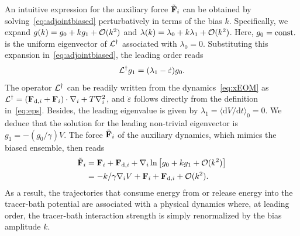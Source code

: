 \documentclass[pre, superscriptaddress, twocolumn,pre]{revtex4-1}
\newcommand{\dd}{\text{d}}
\begin{document}
An intuitive expression for the auxiliary force $\tilde{\bf F}_i$ can be obtained by solving~\eqref{eq:adjointbiased} perturbatively in terms of the bias $k$. Specifically, we expand $g(k)=g_0 + k g_1 + {\cal O}(k^2)$ and $\lambda(k)= \lambda_0 + k \lambda_1 + {\cal O}(k^2)$. Here, $g_0 = {\rm const.}$ is the uniform eigenvector of ${\cal L}^\dagger$ associated with $\lambda_0=0$. Substituting this expansion in~\eqref{eq:adjointbiased}, the leading order reads
\begin{equation}
		{\cal L}^\dagger g_1 = (\lambda_1 - \dot\varepsilon) g_0 .
\end{equation}
The operator ${\cal L}^\dagger$ can be readily written from the dynamics~\eqref{eq:xEOM} as ${\cal L}^\dagger = ({\bf F}_{{\rm d},i}+{\bf F}_i) \cdot \nabla_i + T \nabla^2_i$, and $\dot\varepsilon$ follows directly from the definition in~\eqref{eq:eps}. Besides, the leading eigenvalue is given by $\lambda_1 = \langle\dd V/\dd t\rangle_0 = 0$. We deduce that the solution for the leading non-trivial eigenvector is $g_1 = -(g_0/\gamma) V$. The force $\tilde{\bf F}_i$ of the auxiliary dynamics, which mimics the biased ensemble, then reads
\begin{equation}\label{eq:effectivedynamics}
	\begin{aligned}
		\tilde{\bf F}_i &= {\bf F}_i + {\bf F}_{{\rm d},i} +\nabla_i \ln \left[ g_0 + k g_1 + {\cal O}(k^2) \right]
		\\
		&= -k/\gamma \nabla_i V + {\bf F}_i+ {\bf F}_{{\rm d},i} + {\cal O}(k^2) .
	\end{aligned}
\end{equation}
As a result, the trajectories that consume energy from or release energy into the tracer-bath potential are associated with a physical dynamics where, at leading order, the tracer-bath interaction strength is simply renormalized by the bias amplitude $k$.
\end{document}
